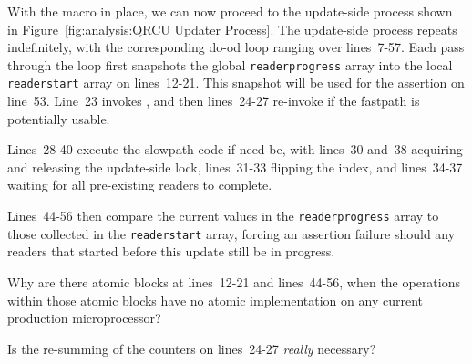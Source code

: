 With the  macro in place, we can now proceed
to the update-side process shown in
Figure~\ref{fig:analysis:QRCU Updater Process}.
The update-side process repeats indefinitely, with the corresponding
do-od loop ranging over lines~7-57.
Each pass through the loop first snapshots the global {\tt readerprogress}
array into the local {\tt readerstart} array on lines~12-21.
This snapshot will be used for the assertion on line~53.
Line~23 invokes , and then lines~24-27
re-invoke  if the fastpath is potentially
usable.

Lines~28-40 execute the slowpath code if need be, with
lines~30 and~38 acquiring and releasing the update-side lock,
lines~31-33 flipping the index, and lines~34-37 waiting for
all pre-existing readers to complete.

Lines~44-56 then compare the current values in the {\tt readerprogress}
array to those collected in the {\tt readerstart} array,
forcing an assertion failure should any readers that started before
this update still be in progress.

\QuickQuiz{}
	Why are there atomic blocks at lines~12-21
	and lines~44-56, when the operations within those atomic
	blocks have no atomic implementation on any current
	production microprocessor?
 \QuickQuizEnd

\QuickQuiz{}
	Is the re-summing of the counters on lines~24-27
	\emph{really} necessary?
 \QuickQuizEnd

